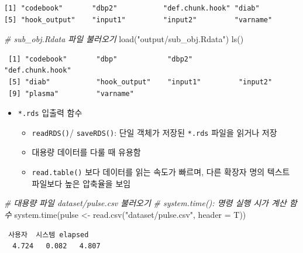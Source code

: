 \documentclass[
  11pt,
]{krantz}
\newenvironment{Shaded}{\begin{snugshade}}{\end{snugshade}}
\newcommand{\AttributeTok}[1]{\textcolor[rgb]{0.61,0.61,0.61}{#1}}
\newcommand{\CommentTok}[1]{\textcolor[rgb]{0.37,0.37,0.37}{\textit{#1}}}
\newcommand{\FunctionTok}[1]{\textcolor[rgb]{0,0,0}{#1}}
\newcommand{\NormalTok}[1]{#1}
\newcommand{\OtherTok}[1]{\textcolor[rgb]{0.37,0.37,0.37}{#1}}
\newcommand{\StringTok}[1]{\textcolor[rgb]{0.5,0.5,0.5}{#1}}
\providecommand{\tightlist}{%
  \setlength{\itemsep}{0pt}\setlength{\parskip}{0pt}}
\begin{document}
\begin{verbatim}
[1] "codebook"       "dbp2"           "def.chunk.hook" "diab"          
[5] "hook_output"    "input1"         "input2"         "varname"       
\end{verbatim}

\begin{Shaded}
\begin{Highlighting}[]
\CommentTok{\# sub\_obj.Rdata 파일 불러오기}
\FunctionTok{load}\NormalTok{(}\StringTok{"output/sub\_obj.Rdata"}\NormalTok{)}
\FunctionTok{ls}\NormalTok{()}
\end{Highlighting}
\end{Shaded}

\begin{verbatim}
 [1] "codebook"       "dbp"            "dbp2"           "def.chunk.hook"
 [5] "diab"           "hook_output"    "input1"         "input2"        
 [9] "plasma"         "varname"       
\end{verbatim}

\normalsize

\begin{itemize}
\tightlist
\item
  \texttt{*.rds} 입출력 함수

  \begin{itemize}
  \tightlist
  \item
    \texttt{readRDS()}/ \texttt{saveRDS()}: 단일 객체가 저장된 \texttt{*.rds} 파일을 읽거나 저장
  \item
    대용량 데이터를 다룰 때 유용함
  \item
    \texttt{read.table()} 보다 데이터를 읽는 속도가 빠르며, 다른 확장자 명의 텍스트 파일보다 높은 압축율을 보임
  \end{itemize}
\end{itemize}

\footnotesize

\begin{Shaded}
\begin{Highlighting}[]
\CommentTok{\# 대용량 파일 dataset/pulse.csv 불러오기}
\CommentTok{\# system.time(): 명령 실행 시가 계산 함수}
\FunctionTok{system.time}\NormalTok{(pulse }\OtherTok{\textless{}{-}} \FunctionTok{read.csv}\NormalTok{(}\StringTok{"dataset/pulse.csv"}\NormalTok{, }\AttributeTok{header =}\NormalTok{ T))}
\end{Highlighting}
\end{Shaded}

\begin{verbatim}
 사용자  시스템 elapsed 
  4.724   0.082   4.807 
\end{verbatim}
\end{document}
